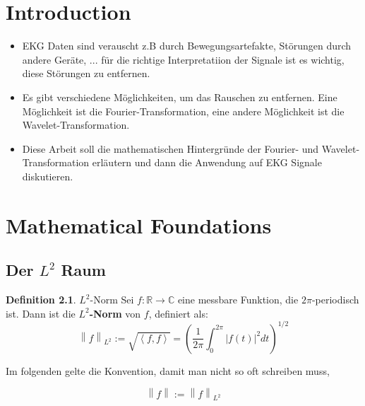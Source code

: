 \documentclass[a4paper,11pt,bibliography=totoc,listof=totoc,headinclude=true,cleardoublepage=empty,oneside]{scrbook}
\newcommand{\norm}[1]{\left\lVert #1 \right\rVert}
\theoremstyle{definition}
\newtheorem{definition}[theorem]{Definition}
\theoremstyle{remark}
\begin{document}
\chapter{Introduction}
\label{chapter:introduction}

{\color{change}

\noindent 
\begin{itemize}
  \item EKG Daten sind verauscht z.B durch Bewegungsartefakte, Störungen durch andere Geräte, ... für die richtige Interpretatiion der Signale ist es wichtig, diese Störungen zu entfernen. 
  \item Es gibt verschiedene Möglichkeiten, um das Rauschen zu entfernen. Eine Möglichkeit ist die Fourier-Transformation, eine andere Möglichkeit ist die Wavelet-Transformation.
  \item Diese Arbeit soll die mathematischen Hintergründe der Fourier- und Wavelet-Transformation erläutern und dann die Anwendung auf EKG Signale diskutieren.
\end{itemize}

}


\chapter{Mathematical Foundations}
\label{chapter:content}

\section{Der $L^2$ Raum}

\begin{definition}{$L^2$-Norm} \cite[S.35, Abschnitt 2.2]{blatterWaveletsEinfuhrung2003}
  Sei $f:\mathbb{R} \to \mathbb{C}$ eine messbare Funktion, die $2\pi$-periodisch ist. 
  Dann ist die \textbf{$L^2$-Norm} von $f$, definiert als: 
  \[  
  \norm{f}_{L^2} := \sqrt{\left\langle f, f \right\rangle} = (\frac{1}{2\pi} \int_{0}^{2\pi} |f(t)|^2 dt)^{1/2}
  \]
\end{definition}


Im folgenden gelte die Konvention, damit man nicht so oft schreiben muss,

\[ 
\norm{f} := \norm{f}_{L^2}
\]
\end{document}
